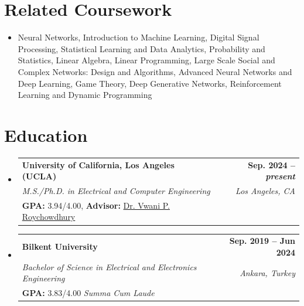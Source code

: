 \documentclass[letterpaper,11pt]{article}
\makeatletter
\newcommand{\resumeBachelorSubheading}[6]{
  \vspace{5pt}\item
    \begin{tabular*}{1.0\textwidth}[t]{l@{\extracolsep{\fill}}r}
      \textbf{#1} & \textbf{\small #2} \\
      \emph{\small#3} & \emph{\small #4} \\
      {\small#5} & \emph{\small #6}
    \end{tabular*}\vspace{-5pt}
}
\newcommand{\resumeSubHeadingListStart}{\begin{itemize}[leftmargin=0.0in, label={}]}
\newcommand{\resumeSubHeadingListEnd}{\end{itemize}}
\makeatother
\begin{document}
\section{Related Coursework}
        \begin{itemize}
        \item Neural Networks, Introduction to Machine Learning, Digital Signal Processing, Statistical Learning and Data Analytics, Probability and Statistics, Linear Algebra, Linear Programming, Large Scale Social and Complex Networks: Design and Algorithms, Advanced Neural Networks and Deep Learning, Game Theory, Deep Generative Networks, Reinforcement Learning and Dynamic Programming
        \end{itemize}
        \vspace*{2.0\multicolsep}
\vspace{-8mm}
\section{Education}
  \resumeSubHeadingListStart
    \resumeBachelorSubheading
      {University of California, Los Angeles (UCLA)}{Sep. 2024 -- \textit{present}}
      {M.S./Ph.D. in Electrical and Computer Engineering}{Los Angeles, CA}
      {\textbf{GPA:} 3.94/4.00, \textbf{Advisor:} \href{https://www.vwaniroychowdhury.com}{Dr. Vwani P. Roychowdhury}}{}
      \vspace{5.5pt}
    \resumeBachelorSubheading
      {Bilkent University}{Sep. 2019 -- Jun 2024}
      {Bachelor of Science in Electrical and Electronics Engineering}{Ankara, Turkey}{\textbf{GPA:} 3.83/4.00 \emph{Summa Cum Laude}}{}
  \resumeSubHeadingListEnd


\vspace{-8mm}
\end{document}
